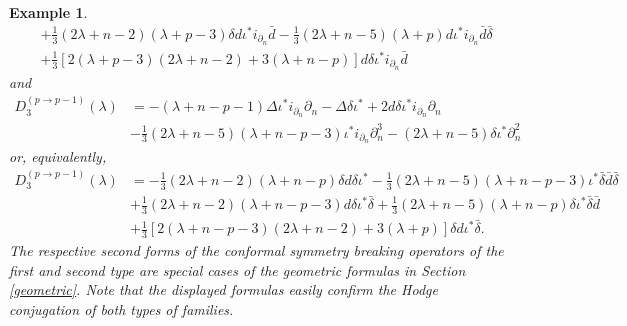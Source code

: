 \documentclass[a4paper,12pt,reqno]{amsart}
\newtheorem{example}[theorem]{Example}
\numberwithin{theorem}{subsection}
\numberwithin{equation}{section}
\begin{document}
\begin{example}
\begin{align*}
   & + \tfrac 13(2\lambda\!+\!n\!-\!2)(\lambda\!+\!p\!-\!3) \delta {d} \iota^* i_{\partial_n} \bar{d}
   -\tfrac 13(2\lambda\!+\!n\!-\!5)(\lambda\!+\!p) {d} \iota^* i_{\partial_n} \bar{d} \bar{\delta}\\
   & + \tfrac 13\left[ 2(\lambda\!+\!p\!-\!3)(2\lambda\!+\!n\!-\!2)
   + 3(\lambda\!+\!n\!-\!p) \right]{d}\delta \iota^* i_{\partial_n}\bar{d}
\end{align*}
and
\begin{align*}
   D^{(p \to p-1)}_3(\lambda)& = -(\lambda\!+\!n\!-\!p\!-\!1) \Delta \iota^*i_{\partial_n}\partial_n
   - \Delta \delta \iota^* + 2{d}\delta \iota^* i_{\partial_n} \partial_n \\
   & -\tfrac 13 (2\lambda\!+\!n\!-\!5)(\lambda\!+\!n\!-\!p\!-\!3)\iota^* i_{\partial_n}\partial_n^3
   - (2\lambda\!+\!n\!-\!5) \delta \iota^* \partial_n^2
\end{align*}
or, equivalently,
\begin{align*}
   D^{(p \to p-1)}_3(\lambda)
   & = -\tfrac 13 (2\lambda\!+\!n\!-\!2)(\lambda\!+\!n\!-\!p) \delta {d}\delta \iota^*
   - \tfrac 13 (2\lambda\!+\!n\!-\!5)(\lambda\!+\!n\!-\!p\!-\!3)\iota^*\bar{\delta}\bar{d}\bar{\delta}\\
   & + \tfrac 13(2\lambda\!+\!n\!-\!2)(\lambda\!+\!n\!-\!p\!-\!3) {d}\delta\iota^*\bar{\delta}
   + \tfrac 13 (2\lambda\!+\!n\!-\!5)(\lambda\!+\!n\!-\!p) \delta\iota^*\bar{\delta}\bar{d}\\
   & + \tfrac 13 \left[ 2(\lambda\!+\!n\!-\!p\!-\!3)(2\lambda\!+\!n\!-\!2)
   + 3(\lambda\!+\!p) \right]\delta {d}\iota^*\bar{\delta}.
\end{align*}
The respective second forms of the conformal symmetry breaking operators of the
first and second type are special cases of the geometric formulas in Section
\ref{geometric}. Note that the displayed formulas easily confirm the Hodge
conjugation of both types of families.
\end{example}
\end{document}
